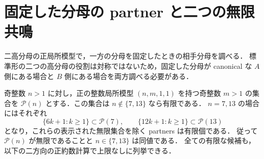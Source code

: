 
\section{固定した分母の partner と二つの無限共鳴}
\label{fp12:section}

二高分母の正局所模型で，一方の分母を固定したときの相手分母を調べる．
標準形の二つの高分母の役割は対称ではないため，固定した分母が
canonical な $A$ 側にある場合と $B$ 側にある場合を両方調べる必要がある．

\begin{theorem}
\label{fp12:partner-structure}
奇整数 $n>1$ に対し，正の整数局所模型 $(n,m,1,1)$ を持つ奇整数 $m>1$ の集合を
$\mathcal P(n)$ とする．この集合は $n\notin\{7,13\}$ なら有限である．
$n=7,13$ の場合にはそれぞれ
\[
 \{6k+1:k\geq1\}\subset\mathcal P(7),\qquad
 \{12k+1:k\geq1\}\subset\mathcal P(13)
\]
となり，これらの表示された無限集合を除く partners は有限個である．
従って $\mathcal P(n)$ が無限であることと $n\in\{7,13\}$ は同値である．
全ての有限な候補も，以下の二方向の正約数計算で上限なしに列挙できる．
\end{theorem}

